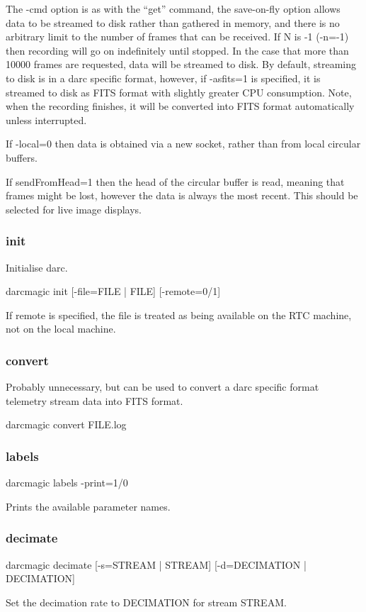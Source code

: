 \documentclass[a4,10pt]{article}
\begin{document}
The -cmd option is as with the ``get'' command, the save-on-fly option
allows data to be streamed to disk rather than gathered in memory, and
there is no arbitrary limit to the number of frames that can be
received.  If N is -1 (-n=-1) then recording will go on indefinitely
until stopped.  In the case that more than 10000 frames are requested,
data will be streamed to disk.  By default, streaming to disk is in a
darc specific format, however, if -asfits=1 is specified, it is
streamed to disk as FITS format with slightly greater CPU consumption.
Note, when the recording finishes, it will be converted into FITS
format automatically unless interrupted.

If -local=0 then data is obtained via a new socket, rather than from
local circular buffers.

If sendFromHead=1 then the head of the circular buffer is read,
meaning that frames might be lost, however the data is always the most
recent.  This should be selected for live image displays.

\subsubsection{init}
Initialise darc.

darcmagic init [-file=FILE | FILE] [-remote=0/1]

If remote is specified, the file is treated as being available on the
RTC machine, not on the local machine.

\subsubsection{convert}
Probably unnecessary, but can be used to convert a darc specific
format telemetry stream data into FITS format.

darcmagic convert FILE.log


\subsubsection{labels}
darcmagic labels -print=1/0

Prints the available parameter names.

\subsubsection{decimate}
darcmagic decimate [-s=STREAM | STREAM] [-d=DECIMATION | DECIMATION]

Set the decimation rate to DECIMATION for stream STREAM.
\end{document}
